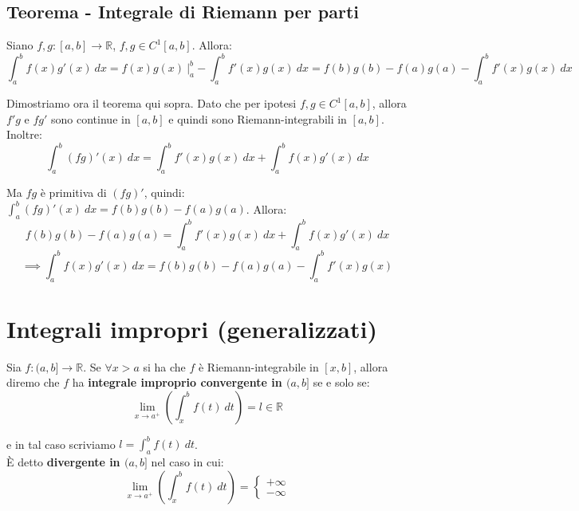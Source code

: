 \documentclass{article}
\begin{document}
\subsection{Teorema - Integrale di Riemann per parti}
Siano $f, g: [a, b] \xrightarrow{} \mathbb{R}$, $f, g \in C^1[a, b]$. Allora:
\begin{equation*}
    \int_a^b f(x)g'(x) \ dx = f(x)g(x) \ \bigg|_a^b - \int_a^b f'(x)g(x) \ dx = f(b)g(b) - f(a)g(a) - \int_a^b f'(x)g(x) \ dx
\end{equation*}

\noindent Dimostriamo ora il teorema qui sopra. Dato che per ipotesi $f, g \in C^1[a, b]$, allora $f'g$ e $fg'$ sono continue in $[a, b]$ e quindi sono Riemann-integrabili in $[a, b]$. Inoltre:
\begin{equation*}
    \int_a^b (fg)'(x) \ dx = \int_a^b f'(x)g(x) \ dx +\int_a^bf(x)g'(x) \ dx
\end{equation*}

\noindent Ma $fg$ è primitiva di $(fg)'$, quindi: $\int_a^b (fg)'(x) \ dx = f(b)g(b) - f(a)g(a)$. Allora:
\begin{equation*}
    f(b)g(b) - f(a)g(a) = \int_a^b f'(x)g(x) \ dx + \int_a^bf(x)g'(x) \ dx
\end{equation*}
\begin{equation*}
    \implies \int_a^bf(x)g'(x) \ dx = f(b)g(b) - f(a)g(a) - \int_a^b f'(x)g(x)
\end{equation*}

\section{Integrali impropri (generalizzati)}
Sia $f: (a, b] \xrightarrow{} \mathbb{R}$. Se $\forall x > a$ si ha che $f$ è Riemann-integrabile in $[x, b]$, allora diremo che $f$ ha \textbf{integrale improprio convergente in $(a, b]$} se e solo se:
\begin{equation*}
    \lim_{x \to a^+} \left(\int_x^b f(t) \ dt\right) = l \in \mathbb{R}
\end{equation*}

\noindent e in tal caso scriviamo $l = \int_a^b f(t) \ dt$. \\
È detto \textbf{divergente in $(a, b]$} nel caso in cui:
\begin{equation*}
    \lim_{x \to a^+} \left(\int_x^b f(t) \ dt\right) = \begin{cases}
        + \infty \\
        -\infty
    \end{cases}
\end{equation*}
\end{document}
